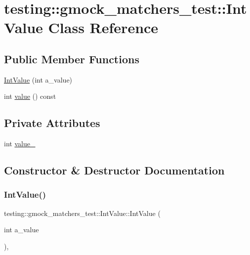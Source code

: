 \hypertarget{classtesting_1_1gmock__matchers__test_1_1_int_value}{}\section{testing\+::gmock\+\_\+matchers\+\_\+test\+::Int\+Value Class Reference}
\label{classtesting_1_1gmock__matchers__test_1_1_int_value}
\subsection*{Public Member Functions}
\begin{DoxyCompactItemize}
\item 
\mbox{\hyperlink{classtesting_1_1gmock__matchers__test_1_1_int_value_a2a294fcf7ad9f4d9888c4e6194fcd848}{Int\+Value}} (int a\+\_\+value)
\item 
int \mbox{\hyperlink{classtesting_1_1gmock__matchers__test_1_1_int_value_a6da000ea8ff787591e07ffaa3c1027d4}{value}} () const
\end{DoxyCompactItemize}
\subsection*{Private Attributes}
\begin{DoxyCompactItemize}
\item 
int \mbox{\hyperlink{classtesting_1_1gmock__matchers__test_1_1_int_value_a1adaa220476c0f29549b36606df3155f}{value\+\_\+}}
\end{DoxyCompactItemize}


\subsection{Constructor \& Destructor Documentation}
\mbox{\label{classtesting_1_1gmock__matchers__test_1_1_int_value_a2a294fcf7ad9f4d9888c4e6194fcd848}} 
\subsubsection{\texorpdfstring{IntValue()}{IntValue()}}
{\footnotesize\ttfamily testing\+::gmock\+\_\+matchers\+\_\+test\+::\+Int\+Value\+::\+Int\+Value (\begin{DoxyParamCaption}\item[{int}]{a\+\_\+value }\end{DoxyParamCaption})\hspace{0.3cm}{\ttfamily [inline]}, {\ttfamily [explicit]}}



